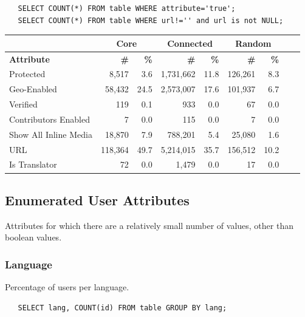 \begin{verbatim}
   SELECT COUNT(*) FROM table WHERE attribute='true';
   SELECT COUNT(*) FROM table WHERE url!='' and url is not NULL;
\end{verbatim}

\begin{tabular}{| l | r | r | r | r | r | r | r | r |}
\hline
& \multicolumn{2}{|c|}{\textbf{Core}} & \multicolumn{2}{|c|}{\textbf{Connected}} & \multicolumn{2}{|c|}{\textbf{Random}} \\ \hline
\textbf{Attribute} & \textbf{\#} & \textbf{\%} & \textbf{\#} & \textbf{\%} & \textbf{\#} & \textbf{\%} \\ \hline
Protected & 8,517 & 3.6 & 1,731,662 & 11.8 & 126,261 & 8.3 \\ \hline
Geo-Enabled & 58,432 & 24.5 & 2,573,007 & 17.6 & 101,937 & 6.7 \\ \hline
Verified & 119 & 0.1 & 933 & 0.0 & 67 & 0.0 \\ \hline
Contributors Enabled & 7 & 0.0 & 115 & 0.0 & 7 & 0.0 \\ \hline
Show All Inline Media & 18,870 & 7.9 & 788,201 & 5.4 & 25,080 & 1.6 \\ \hline
URL & 118,364 & 49.7 & 5,214,015  & 35.7 & 156,512 & 10.2 \\ \hline
Is Translator & 72 & 0.0 & 1,479 & 0.0 & 17 & 0.0 \\ \hline
\end{tabular}

\subsection{Enumerated User Attributes}
Attributes for which there are a relatively small number of values, other than boolean values.
\subsubsection{Language}
Percentage of users per language.

\begin{verbatim}
   SELECT lang, COUNT(id) FROM table GROUP BY lang;
\end{verbatim}

